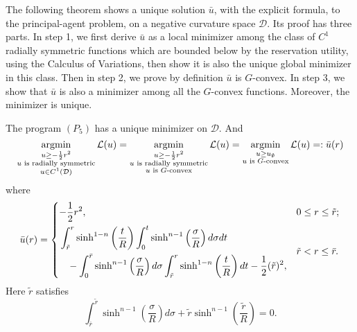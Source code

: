 The following theorem shows a unique solution $\bar{u}$, with the explicit formula, to the principal-agent problem, on a negative curvature space $\mathcal{D}$. Its proof has three parts. In step 1, we first derive $\bar{u}$ as a local minimizer among the class of $C^1$ radially symmetric functions which are bounded below by the reservation utility, using the Calculus of Variations, then show it is also the unique global minimizer in this class. Then in step 2, 
we prove by definition $\bar{u}$ is $G$-convex. In step 3, we show that $\bar{u}$ is also a minimizer among all the $G$-convex functions. Moreover, the minimizer is unique.\medskip

\begin{theorem}\label{unique_minimizer}
	The program $(P_5)$ has a unique minimizer on $\mathcal{D}$. And 
	\begin{equation*}
	\argmin\limits_{\substack{u\ge -\frac{1}{2}r^2 \\ u \text{ is radially symmetric} \\ u \in C^1(\mathcal{D})}} \mathcal{L}(u)= \argmin\limits_{\substack{u\ge -\frac{1}{2}r^2 \\ u \text{ is radially symmetric} \\ u \text{ is $G$-convex}}} \mathcal{L}(u)=\argmin\limits_{\substack{u\ge u_{\emptyset} \\ u \text{ is $G$-convex}}} \mathcal{L}(u) =: \bar{u}(r)
	\end{equation*}
	where
	\begin{equation*}
	\bar{u}(r) = 
	\begin{dcases}
	-\frac{1}{2} r^2, & 0\le r\le \tilde{r}; \\
	\begin{split}
	&\int_{\tilde{r}}^{r}\sinh^{1-n}\left(\frac{t}{R}\right)\int_{0}^{t}\sinh^{n-1}\left(\frac{\sigma}{R}\right)d\sigma dt \\
	&\hspace{0.3cm}- \int_{0}^{\bar{r}}\sinh^{n-1}\left(\frac{\sigma }{R}\right)d \sigma  \int_{\tilde{r}}^{r}\sinh^{1-n}\left(\frac{t}{R}\right) d t -\frac{1}{2}(\tilde{r})^2, 
	\end{split} 
	& \tilde{r} < r \le \bar{r}.\\
	\end{dcases}
	\end{equation*}
	Here $\tilde{r}$ satisfies 
	\begin{equation*}
	\int_{\bar{r}}^{\tilde{r}}\sinh^{n-1}\left(\frac{\sigma }{R}\right) d\sigma  +\tilde{r}\sinh^{n-1}\left(\frac{\tilde{r}}{R}\right)=0.
	\end{equation*}
\end{theorem}

